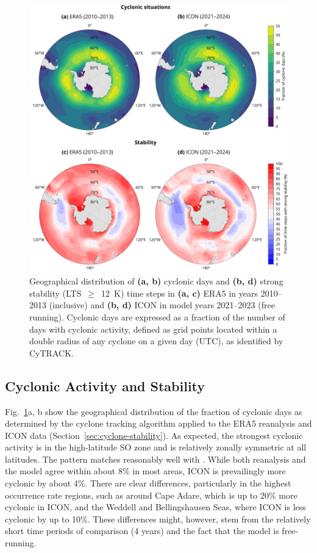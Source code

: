 \documentclass[draft]{agujournal2019}
\begin{document}
\begin{figure}[p!]
\centering
\includegraphics[width=\textwidth]{img/cyc_stab_dist.pdf}
\caption{
Geographical distribution of \textbf{(a, b)} cyclonic days and \textbf{(b, d)} strong stability (LTS~$\geq$~12~K) time steps in \textbf{(a, c)} ERA5 in years 2010--2013 (inclusive) and \textbf{(b, d)} ICON in model years 2021--2023 (free running). Cyclonic days are expressed as a fraction of the number of days with cyclonic activity, defined as grid points located within a double radius of any cyclone on a given day (UTC), as identified by CyTRACK.
}
\label{fig:cyclone-stability}
\end{figure}

\subsection{Cyclonic Activity and Stability}

Fig.~\ref{fig:cyclone-stability}a, b show the geographical distribution of the fraction of cyclonic days as determined by the cyclone tracking algorithm applied to the ERA5 reanalysis and ICON data (Section~\ref{sec:cyclone-stability}). As expected, the strongest cyclonic activity is in the high-latitude SO zone and is relatively zonally symmetric at all latitudes. The pattern matches reasonably well with . While both reanalysis and the model agree within about 8\% in most areas, ICON is prevailingly more cyclonic by about 4\%. There are clear differences, particularly in the highest occurrence rate regions, such as around Cape Adare, which is up to 20\% more cyclonic in ICON, and the Weddell and Bellingshausen Seas, where ICON is less cyclonic by up to 10\%. These differences might, however, stem from the relatively short time periods of comparison (4 years) and the fact that the model is free-running.
\end{document}
